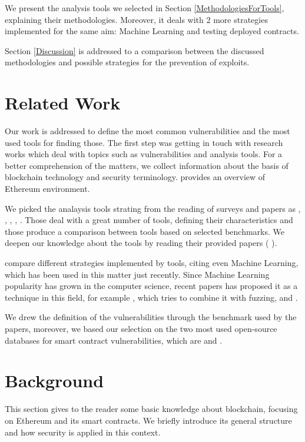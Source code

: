 \documentclass[a4paper,sigconf, language=french,
language=german, language=spanish, language=english]{acmart}
\begin{document}
We present the analysis tools we selected in Section \ref{MethodologiesForTools}, explaining their methodologies. Moreover, it deals with 2 more strategies implemented for the same aim: Machine Learning and testing deployed contracts.

Section \ref{Discussion} is addressed to a comparison between the discussed methodologies and possible strategies for the prevention of exploits.



\section{Related Work}
\label{RelatedWork}
Our work is addressed to define the most common vulnerabilities and the most used tools for finding those.
The first step was getting in touch with research works which deal with topics such as vulnerabilities and analysis tools. For a better comprehension of the matters, we collect information about the basis of blockchain technology and security terminology. \cite{ETHfoundation} provides an overview of Ethereum environment. 

We picked the analaysis tools strating from the reading of surveys and papers as \cite{SurvTools}, \cite{Thesis}, \cite{AutomaticTools}, \cite{AttacksAndProtection}, \cite{ToolsAndVuln}. 
Those deal with a great number of tools, defining their characteristics and those produce a comparison between tools based on selected benchmarks. We deepen our knowledge about the tools by reading their provided papers
(\cite{Slither} \cite{Echidna} \cite{Manticore} \cite{SmartTest} \cite{Oyente}). 

\cite{Methodologies} compare different strategies implemented by tools, citing even Machine Learning, which has been used in this matter just recently.
Since Machine Learning popularity has grown in the computer science, recent papers has proposed it as a technique in this field, for example \cite{FuzzML}, which tries to combine it with fuzzing, and \cite{MLSmartContractPropose}. 

We drew the definition of the vulnerabilities through the benchmark used by the papers, moreover, we based our selection on the two most used open-source databases for smart contract vulnerabilities, which are \cite{SWC} and \cite{DASP10}.

\section{Background}
\label{Background}
This section gives to the reader some basic knowledge about blockchain, focusing on Ethereum and its smart contracts. We briefly introduce its general structure and how security is applied in this context.
\end{document}
